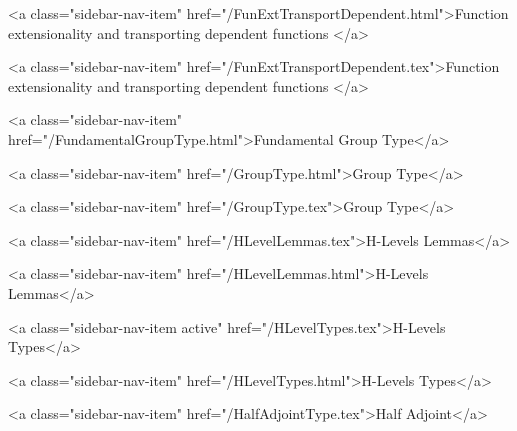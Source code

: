       
    
      
        
          <a class="sidebar-nav-item" href="/FunExtTransportDependent.html">Function extensionality and transporting dependent functions </a>
        
      
    
      
        
          <a class="sidebar-nav-item" href="/FunExtTransportDependent.tex">Function extensionality and transporting dependent functions </a>
        
      
    
      
        
          <a class="sidebar-nav-item" href="/FundamentalGroupType.html">Fundamental Group Type</a>
        
      
    
      
        
          <a class="sidebar-nav-item" href="/GroupType.html">Group Type</a>
        
      
    
      
        
          <a class="sidebar-nav-item" href="/GroupType.tex">Group Type</a>
        
      
    
      
        
          <a class="sidebar-nav-item" href="/HLevelLemmas.tex">H-Levels Lemmas</a>
        
      
    
      
        
          <a class="sidebar-nav-item" href="/HLevelLemmas.html">H-Levels Lemmas</a>
        
      
    
      
        
          <a class="sidebar-nav-item active" href="/HLevelTypes.tex">H-Levels Types</a>
        
      
    
      
        
          <a class="sidebar-nav-item" href="/HLevelTypes.html">H-Levels Types</a>
        
      
    
      
        
          <a class="sidebar-nav-item" href="/HalfAdjointType.tex">Half Adjoint</a>
        
      
    
      
        
